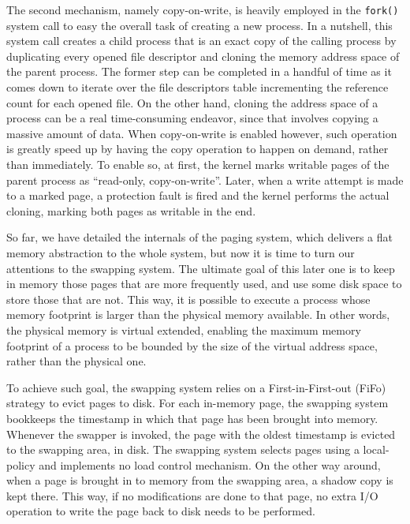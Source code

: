 \documentclass[10pt,a4paper]{article}
\begin{document}
The second mechanism, namely copy-on-write, is heavily employed in the \texttt{fork()} system call to easy the overall task of creating a new process. In a nutshell, this system call creates a child process that is an exact copy of the calling process by duplicating every opened file descriptor and cloning the memory address space of the parent process. The former step can be completed in a handful of time as it comes down to iterate over the file descriptors table incrementing the reference count for each opened file. On the other hand, cloning the address space of a process can be a real time-consuming endeavor, since that involves copying a massive amount of data. When copy-on-write is enabled however, such operation is greatly speed up by having the copy operation to happen on demand, rather than immediately. To enable so, at first, the kernel marks writable pages of the parent process as ``read-only, copy-on-write''. Later, when a write attempt is made to a marked page, a protection fault is fired and the kernel performs the actual cloning, marking both pages as writable in the end.

So far, we have detailed the internals of the paging system, which delivers a flat memory abstraction to the whole system, but now it is time to turn our attentions to the swapping system. The ultimate goal of this later one is to keep in memory those pages that are more frequently used, and use some disk space to store those that are not. This way, it is possible to execute a process whose memory footprint is larger than the physical memory available. In other words, the physical memory is virtual extended, enabling the maximum memory footprint of a process to be bounded by the size of the virtual address space, rather than the physical one.

To achieve such goal, the swapping system relies on a First-in-First-out (FiFo) strategy to evict pages to disk. For each in-memory page, the swapping system bookkeeps the timestamp in which that page has been brought into memory. Whenever the swapper is invoked, the page with the oldest timestamp is evicted to the swapping area, in disk. The swapping system selects pages using a local-policy and implements no load control mechanism. On the other way around, when a page is brought in to memory from the swapping area, a shadow copy is kept there. This way, if no modifications are done to that page, no extra I/O operation to write the page back to disk needs to be performed.
\end{document}
